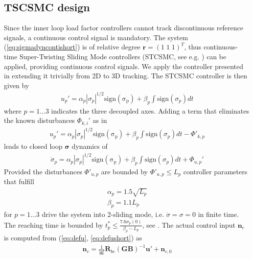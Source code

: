 \documentclass{ifacconf}
\providecommand{\mbf}[1]{\mathbf{#1}}
\newcommand{\idxAxis}{{\ensuremath{p}}}
\begin{document}
\subsection{TSCSMC design}
Since the inner loop load factor controllers cannot track discontinuous reference signals, a continuous control signal is mandatory.
The system (\ref{eq:sigmadyncontishort}) is of relative degree $\mbf{r} = (1 \; 1 \; 1)^T$, thus continuous-time Super-Twisting Sliding Mode controllers (STCSMC, see e.g. \cite{shtessel2014sliding}) can be applied, providing continuous control signals.
We apply the controller presented in \cite{galzi2006uav} extending it trivially from 2D to 3D tracking.
The STCSMC controller is then given by
\begin{align}
u_\idxAxis' = \alpha_\idxAxis |\sigma_\idxAxis|^{1/2}\mathrm{sign(\sigma_\idxAxis)} + \beta_\idxAxis \int \mathrm{sign}(\sigma_\idxAxis) dt
\end{align}
where $\idxAxis = 1...3$ indicates the three decoupled axes. Adding a term that eliminates the known disturbances ${\Phi}_{k,i}'$ as in \cite{galzi2006uav}
\begin{align}
u_\idxAxis' = \alpha_\idxAxis |\sigma_\idxAxis|^{1/2}\mathrm{sign(\sigma_\idxAxis)} + \beta_\idxAxis \int \mathrm{sign}(\sigma_\idxAxis) dt - {\Phi}'_{k,\idxAxis}
\end{align}
leads to closed loop $\mbf{\sigma}$ dynamics of
\begin{align}
\dot{\sigma}_\idxAxis = \alpha_\idxAxis |\sigma_\idxAxis|^{1/2}\mathrm{sign(\sigma_\idxAxis)} + \beta_\idxAxis \int \mathrm{sign}(\sigma_\idxAxis) dt + \Phi_{u,\idxAxis}'
\end{align}
Provided the disturbances $\Phi'_{u,\idxAxis}$ are bounded by $\Phi'_{u,\idxAxis} \leq L_\idxAxis$ controller parameters that fulfill
\begin{align}
\alpha_\idxAxis = 1.5 \sqrt{L_\idxAxis}
\label{eq:csmcgainconditionalpha}\\
\beta_\idxAxis = 1.1 L_\idxAxis
\label{eq:csmcgainconditionbeta}
\end{align}
for $\idxAxis=1...3$ drive the system into 2-sliding mode, i.e. $\dot{\sigma} = \sigma = 0$ in finite time. The reaching time is bounded by $t_\idxAxis^* \leq \frac{7.6 \sigma_\idxAxis(0)}{\beta_\idxAxis - L_\idxAxis}$, see \cite{galzi2006uav}.
The actual control input $\mbf{n}_c$ is computed from (\ref{eq:defu}, \ref{eq:defushort}) as
\begin{align}
\mbf{n}_c = \frac{1}{|\mbf{g}|} \mbf{R}_{be}(\mbf{GB})^{-1} \mbf{u}' + \mbf{n}_{c,0}
\end{align}
\end{document}
